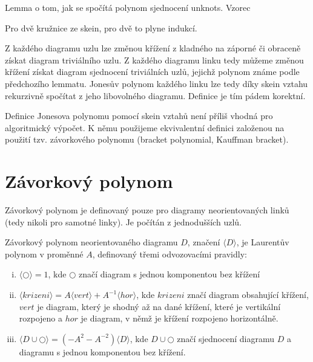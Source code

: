 \begin{lemma}
Lemma o tom, jak se spočítá polynom sjednocení unknots. Vzorec
\end{lemma}
\begin{dukaz}
Pro dvě kružnice ze skein, pro dvě to plyne indukcí.
\end{dukaz}

\begin{pozn}
Z každého diagramu uzlu lze změnou křížení z kladného na záporné či obraceně získat diagram triviálního uzlu. Z každého diagramu linku tedy můžeme změnou křížení získat diagram sjednocení triviálních uzlů, jejichž polynom známe podle předchozího lemmatu. Jonesův polynom každého linku lze tedy díky skein vztahu rekurzivně spočítat z jeho libovolného diagramu. Definice je tím pádem korektní.
\end{pozn}

Definice Jonesova polynomu pomocí skein vztahů není příliš vhodná pro algoritmický výpočet. K němu použijeme ekvivalentní definici založenou na použití tzv. závorkového polynomu (bracket polynomial, Kauffman bracket).

\section{Závorkový polynom}
Závorkový polynom je definovaný pouze pro diagramy neorientovaných linků (tedy nikoli pro samotné linky). Je počítán z jednodušších uzlů.

\begin{definice}\label{def01:2}
Závorkový polynom neorientovaného diagramu $D$, značení $\langle D \rangle$, je Laurentův polynom v proměnné $A$, definovaný třemi odvozovacími pravidly:
\begin{enumerate}[i.]
\item
$ \langle \bigcirc  \rangle = 1$, kde $\bigcirc$ značí diagram s jednou komponentou bez křížení
\item
$ \langle krizeni  \rangle = A  \langle vert \rangle + A^{-1}  \langle hor \rangle $, kde $krizeni$ značí diagram obsahující křížení, $vert$ je diagram, který je shodný až na dané křížení, které je vertikální rozpojeno a $hor$ je diagram, v němž je křížení rozpojeno horizontálně.
\item
$ \langle D \cup \bigcirc \rangle = (-A^2 - A^{-2}) \langle D \rangle$, kde $D \cup \bigcirc $ značí sjednocení diagramu $D$ a diagramu s jednou komponentou bez křížení.
\end{enumerate}

\end{definice}

